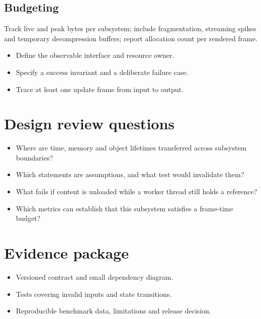 \documentclass[11pt,letterpaper]{article}
\begin{document}
\subsection{Budgeting}
Track live and peak bytes per subsystem; include fragmentation, streaming spikes and temporary decompression buffers; report allocation count per rendered frame.

\begin{itemize}
\item Define the observable interface and resource owner.
\item Specify a success invariant and a deliberate failure case.
\item Trace at least one update frame from input to output.
\end{itemize}
\section{Design review questions}
\begin{itemize}
\item Where are time, memory and object lifetimes transferred across subsystem boundaries?
\item Which statements are assumptions, and what test would invalidate them?
\item What fails if content is unloaded while a worker thread still holds a reference?
\item Which metrics can establish that this subsystem satisfies a frame-time budget?
\end{itemize}
\section{Evidence package}
\begin{itemize}
\item Versioned contract and small dependency diagram.
\item Tests covering invalid inputs and state transitions.
\item Reproducible benchmark data, limitations and release decision.
\end{itemize}
\end{document}
